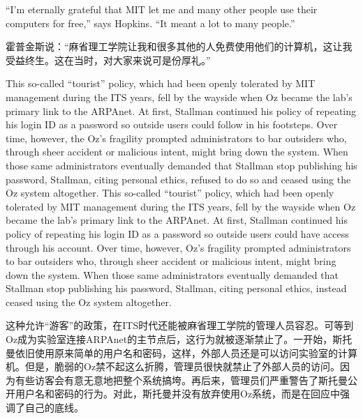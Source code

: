 \ifdefined\eng
``I'm eternally grateful that MIT let me and many other people use their computers for free,'' says Hopkins. ``It meant a lot to many people.''
\fi

\ifdefined\chs
霍普金斯说：``麻省理工学院让我和很多其他的人免费使用他们的计算机，这让我受益终生。这在当时，对大家来说可是份厚礼。''
\fi

\ifdefined\eng
\ifdefined\vone
This so-called ``tourist'' policy, which had been openly tolerated by MIT management during the ITS years, fell by the wayside when Oz became the lab's primary link to the ARPAnet. At first, Stallman continued his policy of repeating his login ID as a password so outside users could follow in his footsteps. Over time, however, the Oz's fragility prompted administrators to bar outsiders who, through sheer accident or malicious intent, might bring down the system. When those same administrators eventually demanded that Stallman stop publishing his password, Stallman, citing personal ethics, refused to do so and ceased using the Oz system altogether.
\fi
\ifdefined\vtwo
This so-called ``tourist'' policy, which had been openly tolerated by MIT management during the ITS years, fell by the wayside when Oz became the lab's primary link to the ARPAnet. At first, Stallman continued his policy of repeating his login ID as a password so outside users could have access through his account. Over time, however, Oz's fragility prompted administrators to bar outsiders who, through sheer accident or malicious intent, might bring down the system. When those same administrators eventually demanded that Stallman stop publishing his password, Stallman, citing personal ethics, instead ceased using the Oz system altogether.
\fi
\fi

\ifdefined\chs
这种允许``游客''的政策，在ITS时代还能被麻省理工学院的管理人员容忍。可等到Oz成为实验室连接ARPAnet的主节点后，这行为就被逐渐禁止了。一开始，斯托曼依旧使用原来简单的用户名和密码，这样，外部人员还是可以访问实验室的计算机。但是，脆弱的Oz禁不起这么折腾，管理员很快就禁止了外部人员的访问。因为有些访客会有意无意地把整个系统搞垮。再后来，管理员们严重警告了斯托曼公开用户名和密码的行为。对此，斯托曼并没有放弃使用Oz系统，而是在回应中强调了自己的底线。
\fi

